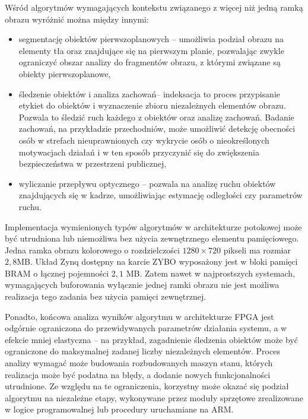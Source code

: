 Wśród algorytmów wymagających kontekstu związanego z więcej niż jedną ramką obrazu wyróżnić można między innymi:
\begin{itemize}
	\item segmentację obiektów pierwszoplanowych -- umożliwia podział obrazu na elementy tła oraz znajdujące się na pierwszym planie, pozwalając zwykle ograniczyć obszar analizy do fragmentów obrazu, z którymi związane są obiekty pierwszoplanowe,

	\item śledzenie obiektów i analiza zachowań-- indeksacja to proces przypisanie etykiet do obiektów i wyznaczenie zbioru niezależnych elementów obrazu. Pozwala to śledzić ruch każdego z obiektów oraz analizę zachowań. Badanie zachowań, na przykładzie przechodniów, może umożliwić detekcję obecności osób w strefach nieuprawnionych czy wykrycie osób o nieokreślonych motywacjach działań i w ten sposób przyczynić się do zwiększenia bezpieczeństwa w przestrzeni publicznej,
	
	\item wyliczanie przepływu optycznego -- pozwala na analizę ruchu obiektów znajdujących się w kadrze, umożliwiając estymację odległości czy parametrów ruchu.

\end{itemize}

Implementacja wymienionych typów algorytmów w architekturze potokowej może być utrudniona lub niemożliwa bez użycia zewnętrznego elementu pamięciowego. 
Jedna ramka obrazu kolorowego o rozdzielczości $1280 \times 720$ pikseli ma rozmiar $2,8$MB. 
Układ Zynq dostępny na karcie ZYBO wyposażony jest w bloki pamięci BRAM o łącznej pojemności $2,1$ MB. 
Zatem nawet w najprostszych systemach, wymagających buforowania wyłącznie jednej ramki obrazu nie jest możliwa realizacja tego zadania bez użycia pamięci zewnętrznej.

Ponadto, końcowa analiza wyników algorytmu w architekturze FPGA jest odgórnie ograniczona do przewidywanych parametrów działania systemu, a w efekcie mniej elastyczna -- na przykład, zagadnienie śledzenia obiektów może być ograniczone do maksymalnej zadanej liczby niezależnych elementów. Proces analizy wymagać może budowania rozbudowanych maszyn stanu, których realizacja może być podatna na błędy, a dodanie nowych funkcjonalności utrudnione.
Ze względu na te ograniczenia, korzystny może okazać się podział algorytmu na niezależne etapy, wykonywane przez moduły sprzętowe zrealizowane w logice programowalnej lub procedury uruchamiane na ARM.  

